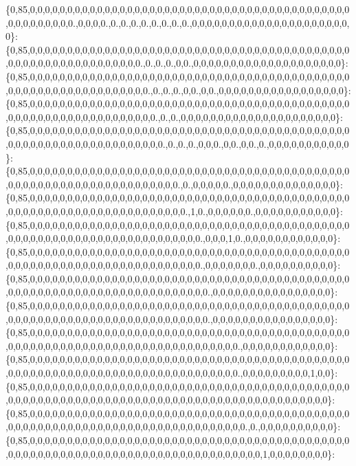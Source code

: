 \{0,85,0,0,0,0,0,0,0,0,0,0,0,0,0,0,0,0,0,0,0,0,0,0,0,0,0,0,0,0,0,0,0,0,0,0,0,0,0,0,0,0,0,0,0,0,0,0,0,0,0,0,0,0.,0,0,0,0.,0.,0.,0.,0.,0.,0.,0.,0.,0,0,0,0,0,0,0,0,0,0,0,0,0,0,0,0,0,0,0,0,0,0\}\+: \{0,85,0,0,0,0,0,0,0,0,0,0,0,0,0,0,0,0,0,0,0,0,0,0,0,0,0,0,0,0,0,0,0,0,0,0,0,0,0,0,0,0,0,0,0,0,0,0,0,0,0,0,0,0,0,0,0,0,0,0,0,0,0.,0.,0.,0.,0,0.,0,0,0,0,0,0,0,0,0,0,0,0,0,0,0,0,0,0,0,0\}\+: \{0,85,0,0,0,0,0,0,0,0,0,0,0,0,0,0,0,0,0,0,0,0,0,0,0,0,0,0,0,0,0,0,0,0,0,0,0,0,0,0,0,0,0,0,0,0,0,0,0,0,0,0,0,0,0,0,0,0,0,0,0,0,0,0.,0.,0.,0.,0,0.,0,0.,0,0,0,0,0,0,0,0,0,0,0,0,0,0,0,0,0\}\+: \{0,85,0,0,0,0,0,0,0,0,0,0,0,0,0,0,0,0,0,0,0,0,0,0,0,0,0,0,0,0,0,0,0,0,0,0,0,0,0,0,0,0,0,0,0,0,0,0,0,0,0,0,0,0,0,0,0,0,0,0,0,0,0,0,0.,0.,0.,0,0,0,0,0,0,0,0,0,0,0,0,0,0,0,0,0,0,0,0,0\}\+: \{0,85,0,0,0,0,0,0,0,0,0,0,0,0,0,0,0,0,0,0,0,0,0,0,0,0,0,0,0,0,0,0,0,0,0,0,0,0,0,0,0,0,0,0,0,0,0,0,0,0,0,0,0,0,0,0,0,0,0,0,0,0,0,0,0,0.,0.,0.,0.,0,0,0.,0,0.,0,0.,0.,0,0,0,0,0,0,0,0,0,0,0\}\+: \{0,85,0,0,0,0,0,0,0,0,0,0,0,0,0,0,0,0,0,0,0,0,0,0,0,0,0,0,0,0,0,0,0,0,0,0,0,0,0,0,0,0,0,0,0,0,0,0,0,0,0,0,0,0,0,0,0,0,0,0,0,0,0,0,0,0,0,0.,0.,0,0,0,0,0.,0,0,0,0,0,0,0,0,0,0,0,0,0,0\}\+: \{0,85,0,0,0,0,0,0,0,0,0,0,0,0,0,0,0,0,0,0,0,0,0,0,0,0,0,0,0,0,0,0,0,0,0,0,0,0,0,0,0,0,0,0,0,0,0,0,0,0,0,0,0,0,0,0,0,0,0,0,0,0,0,0,0,0,0,0,0.,1,0.,0,0,0,0,0,0.,0,0,0,0,0,0,0,0,0,0,0\}\+: \{0,85,0,0,0,0,0,0,0,0,0,0,0,0,0,0,0,0,0,0,0,0,0,0,0,0,0,0,0,0,0,0,0,0,0,0,0,0,0,0,0,0,0,0,0,0,0,0,0,0,0,0,0,0,0,0,0,0,0,0,0,0,0,0,0,0,0,0,0,0,0.,0,0,0,1,0.,0,0,0,0,0,0,0,0,0,0,0,0\}\+: \{0,85,0,0,0,0,0,0,0,0,0,0,0,0,0,0,0,0,0,0,0,0,0,0,0,0,0,0,0,0,0,0,0,0,0,0,0,0,0,0,0,0,0,0,0,0,0,0,0,0,0,0,0,0,0,0,0,0,0,0,0,0,0,0,0,0,0,0,0,0,0.,0,0,0,0,0,0,0.,0,0,0,0,0,0,0,0,0,0\}\+: \{0,85,0,0,0,0,0,0,0,0,0,0,0,0,0,0,0,0,0,0,0,0,0,0,0,0,0,0,0,0,0,0,0,0,0,0,0,0,0,0,0,0,0,0,0,0,0,0,0,0,0,0,0,0,0,0,0,0,0,0,0,0,0,0,0,0,0,0,0,0,0,0.,0,0,0,0,0,0,0,0,0,0,0,0,0,0,0,0\}\+: \{0,85,0,0,0,0,0,0,0,0,0,0,0,0,0,0,0,0,0,0,0,0,0,0,0,0,0,0,0,0,0,0,0,0,0,0,0,0,0,0,0,0,0,0,0,0,0,0,0,0,0,0,0,0,0,0,0,0,0,0,0,0,0,0,0,0,0,0,0,0,0,0.,0,0,0,0,0,0,0,0,0,0,0,0,0,0,0,0\}\+: \{0,85,0,0,0,0,0,0,0,0,0,0,0,0,0,0,0,0,0,0,0,0,0,0,0,0,0,0,0,0,0,0,0,0,0,0,0,0,0,0,0,0,0,0,0,0,0,0,0,0,0,0,0,0,0,0,0,0,0,0,0,0,0,0,0,0,0,0,0,0,0,0,0,0,0,0.,0,0,0,0,0,0,0,0,0,0,0,0\}\+: \{0,85,0,0,0,0,0,0,0,0,0,0,0,0,0,0,0,0,0,0,0,0,0,0,0,0,0,0,0,0,0,0,0,0,0,0,0,0,0,0,0,0,0,0,0,0,0,0,0,0,0,0,0,0,0,0,0,0,0,0,0,0,0,0,0,0,0,0,0,0,0,0,0,0,0,0.,0,0,0,0,0,0,0,0,0,1,0,0\}\+: \{0,85,0,0,0,0,0,0,0,0,0,0,0,0,0,0,0,0,0,0,0,0,0,0,0,0,0,0,0,0,0,0,0,0,0,0,0,0,0,0,0,0,0,0,0,0,0,0,0,0,0,0,0,0,0,0,0,0,0,0,0,0,0,0,0,0,0,0,0,0,0,0,0,0,0,0,0,0,0,0,0,0,0,0,0,0,0,0\}\+: \{0,85,0,0,0,0,0,0,0,0,0,0,0,0,0,0,0,0,0,0,0,0,0,0,0,0,0,0,0,0,0,0,0,0,0,0,0,0,0,0,0,0,0,0,0,0,0,0,0,0,0,0,0,0,0,0,0,0,0,0,0,0,0,0,0,0,0,0,0,0,0,0,0,0,0,0,0.,0.,0,0,0,0,0,0,0,0,0,0\}\+: \{0,85,0,0,0,0,0,0,0,0,0,0,0,0,0,0,0,0,0,0,0,0,0,0,0,0,0,0,0,0,0,0,0,0,0,0,0,0,0,0,0,0,0,0,0,0,0,0,0,0,0,0,0,0,0,0,0,0,0,0,0,0,0,0,0,0,0,0,0,0,0,0,0,0,0,0,0,0,0,1,0,0,0,0,0,0,0,0\}\+: 